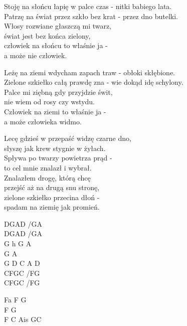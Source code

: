 \begin{text}

    Stoję na słońcu łapię w palce czas - nitki babiego lata.\\
    Patrzę na świat przez szkło bez krat - przez dno butelki.\\
    Włosy rozwiane głaszczą mi twarz,\\
    świat jest bez końca zielony,\\
    człowiek na słońcu to właśnie ja -\\
    a może nie człowiek.

    Leżę na ziemi wdycham zapach traw - obłoki skłębione.\\
    Zielone szkiełko całą prawdę zna - wie dokąd idę schylony.\\
    Palce mi ziębną gdy przyjdzie świt,\\
    nie wiem od rosy czy wstydu.\\
    Człowiek na ziemi to właśnie ja -\\
    a może człowieka widmo.

    Lecę gdzieś w przepaść widzę czarne dno,\\
    słyszę jak krew stygnie w żyłach.\\
    Spływa po twarzy powietrza prąd -\\
    to cel mnie znalazł i wybrał.\\
    Znalazłem drogę, którą chcę\\
    przejść aż na drugą snu stronę,\\
    zielone szkiełko przecina dłoń -\\
    spadam na ziemię jak promień.
    
\end{text}
\begin{chord}
    \small{
    DGAD /GA\\
    DGAD /GA\\
    G h G A\\
    G A\\
    G D C A D\\
    CFGC /FG\\
    CFGC /FG

    \hfill\break
    \hfill\break
    \hfill\break
    \hfill\break
    \hfill\break
    \hfill\break
    \hfill\break
    \hfill\break
    \hfill\break
    \hfill\break
    \hfill\break
    \hfill\break
    \hfill\break
    Fa F G\\
    F G\\
    F C Ais GC
    }
\end{chord}